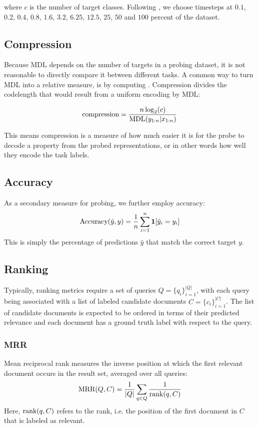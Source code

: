 where $c$ is the number of target classes.
Following \cite{voita-titov-2020-information}, we choose timesteps at $0.1$, $0.2$, $0.4$, $0.8$, $1.6$, $3.2$, $6.25$, $12.5$, $25$, $50$ and $100$ percent of the dataset.

\subsection{Compression}
Because MDL depends on the number of targets in a probing dataset, it is not reasonable to directly compare it between different tasks. A common way to turn MDL into a relative measure, is by computing . Compression divides the codelength that would result from a uniform encoding by MDL:

\begin{equation}
    \text{compression} = \frac{n \log_2(c)}{\text{MDL}(y_{1:n} | x_{1:n})}
\end{equation}

This means compression is a measure of how much easier it is for the probe to decode a property from the probed representations, or in other words how well they encode the task labels.

\subsection{Accuracy}
As a secondary measure for probing, we further employ accuracy:
\begin{equation}
    \text{Accuracy}(\hat{y}, y) = \frac{1}{n} \sum_{i=1}^n \mathbf{1} [\hat{y}_i = y_i]
\end{equation}
This is simply the percentage of predictions $\hat{y}$ that match the correct target $y$.

\subsection{Ranking}
Typically, ranking metrics require a set of queries $Q=\{q_i\}_{i=1}^{|Q|}$, with each query being associated with a list of labeled candidate documents $C=\{c_i\}_{i=1}^{|C|}$. The list of candidate documents is expected to be ordered in terms of their predicted relevance and each document has a ground truth label with respect to the query.

\subsubsection{MRR}
Mean reciprocal rank measures the inverse position at which the first relevant document occurs in the result set, averaged over all queries:
\begin{equation}
    \text{MRR}(Q, C) = \frac{1}{|Q|} \sum_{q \in Q} \frac{1}{\text{rank}(q, C)}
\end{equation}
Here, $\text{rank}(q, C)$ refers to the rank, i.e. the position of the first document in $C$ that is labeled as relevant.

